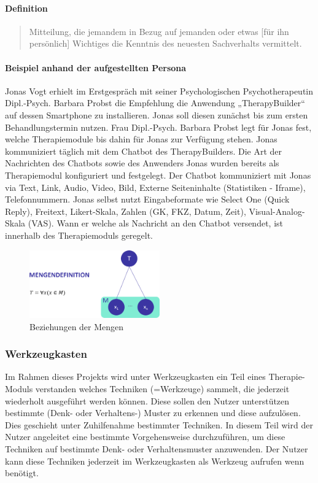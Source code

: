 \paragraph{Definition}
\begin{quote}
Mitteilung, die jemandem in Bezug auf jemanden oder etwas [für ihn persönlich] Wichtiges die Kenntnis des neuesten Sachverhalts vermittelt. \cite{DudenNac9:online}
\end{quote}

\paragraph{Beispiel anhand der aufgestellten Persona}
Jonas Vogt erhielt im Erstgespräch mit seiner Psychologischen Psychotherapeutin Dipl.-Psych. Barbara Probst die Empfehlung die Anwendung „TherapyBuilder“ auf dessen Smartphone zu installieren. Jonas soll diesen zunächst bis zum ersten Behandlungstermin nutzen. Frau Dipl.-Psych. Barbara Probst legt für Jonas fest, welche Therapiemodule bis dahin für Jonas zur Verfügung stehen. Jonas kommuniziert täglich mit dem Chatbot des TherapyBuilders. Die Art der Nachrichten des Chatbots sowie des Anwenders Jonas wurden bereits als Therapiemodul konfiguriert und festgelegt. Der Chatbot kommuniziert mit Jonas via Text, Link, Audio, Video, Bild, Externe Seiteninhalte (Statistiken - Iframe), Telefonnummern. Jonas selbst nutzt Eingabeformate wie Select One (Quick Reply), Freitext, Likert-Skala, Zahlen (GK, FKZ, Datum, Zeit), Visual-Analog-Skala (VAS). Wann er welche als Nachricht an den Chatbot versendet, ist innerhalb des Therapiemoduls geregelt.

\begin{figure}[h]
\centering
\includegraphics[width=0.5\textwidth]{pictures/therapiedef}
\caption{Beziehungen der Mengen}
\label{therapiedef}
\end{figure}

\subsubsection{Werkzeugkasten}
Im Rahmen dieses Projekts wird unter Werkzeugkasten ein Teil eines Therapie-Moduls verstanden welches Techniken (=Werkzeuge) sammelt, die jederzeit wiederholt ausgeführt werden können. Diese sollen den Nutzer unterstützen bestimmte (Denk- oder Verhaltens-) Muster zu erkennen und diese aufzulösen. Dies geschieht unter Zuhilfenahme bestimmter Techniken. In diesem Teil wird der Nutzer angeleitet eine bestimmte Vorgehensweise durchzuführen, um diese Techniken auf bestimmte Denk- oder Verhaltensmuster anzuwenden. Der Nutzer kann diese Techniken jederzeit im Werkzeugkasten als Werkzeug aufrufen wenn benötigt.


